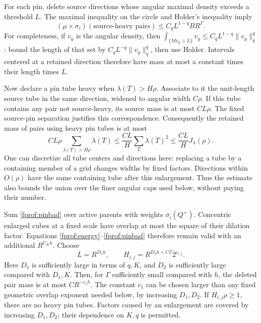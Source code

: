 For each pin, delete source directions whose angular maximal density exceeds a threshold \(L\). The maximal inequality on the circle and Holder's inequality imply
\begin{equation}\label{fprof:sourcebad}
 (\mu\times\sigma_i)(\text{source-heavy pairs})
 \leq C_q L^{1-q} B R^\Gamma.
\end{equation}
For completeness, if \(v_y\) is the angular density, then
\(\int_{\{Mv_y>L\}}v_y\leq C_qL^{1-q}\|v_y\|_q^q\): bound the length of that set by \(C_qL^{-q}\|v_y\|_q^q\), then use Holder. Intervals centered at a retained direction therefore have mass at most a constant times their length times \(L\).

Now declare a pin tube heavy when \(\lambda(T)>H\rho\). Associate to it the unit-length source tube in the same direction, widened to angular width \(C\rho\). If this tube contains any pair not source-heavy, its source mass is at most \(CL\rho\). The fixed source-pin separation justifies this correspondence. Consequently the retained mass of pairs using heavy pin tubes is at most
\begin{equation}\label{fprof:pinbad}
 CL\rho\sum_{\lambda(T)>H\rho}\lambda(T)
 \leq \frac{CL}{H}\sum_T\lambda(T)^2
 \leq \frac{CL}{H}J_\lambda(\rho).
\end{equation}
One can discretize all tube centers and directions here: replacing a tube by a containing member of a grid changes widths by fixed factors. Directions within \(O(\rho)\) have the same containing tube after this enlargement. Thus the estimate also bounds the union over the finer angular caps used below, without paying their number.

Sum \eqref{fprof:pinbad} over active parents with weights \(\sigma_i(Q^+)\). Concentric enlarged cubes at a fixed scale have overlap at most the square of their dilation factor. Equations \eqref{fprof:energy}--\eqref{fprof:pinbad} therefore remain valid with an additional \(R^{C_Kh}\). Choose
\begin{equation}\label{fprof:thresholds}
 L=R^{D_1h},\qquad H_{i,j}=R^{D_2h+C\Gamma}2^{c_{i,j}}.
\end{equation}
Here \(D_1\) is sufficiently large in terms of \(q,K\), and \(D_2\) is sufficiently large compared with \(D_1,K\). Then, for \(\Gamma\) sufficiently small compared with \(h\), the deleted pair mass is at most \(C R^{-c_1h}\). The constant \(c_1\) can be chosen larger than any fixed geometric overlap exponent needed below, by increasing \(D_1,D_2\). If \(H_{i,j}\rho\geq1\), there are no heavy pin tubes. Factors caused by an enlargement are covered by increasing \(D_1,D_2\); their dependence on \(K,q\) is permitted.

